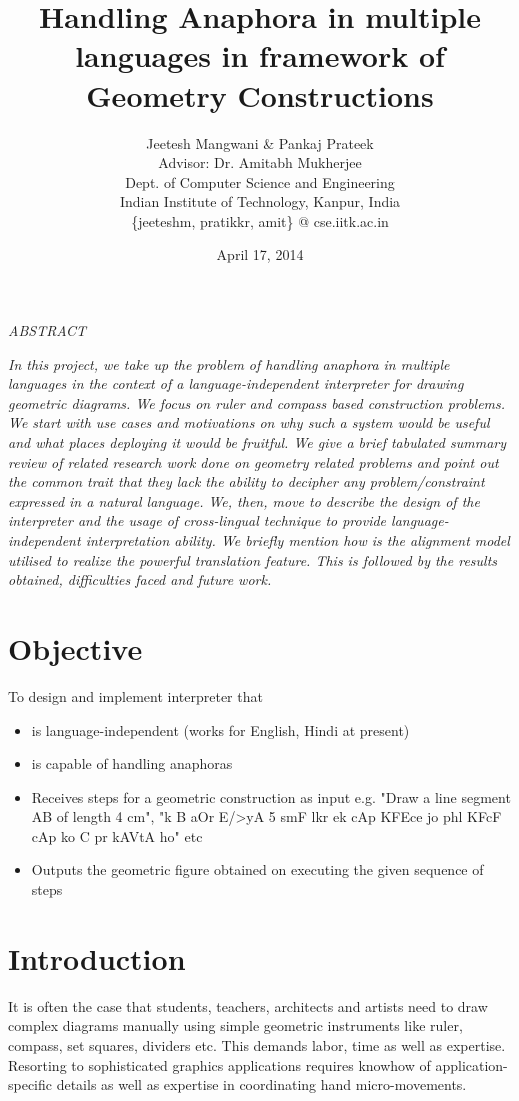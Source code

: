 \def\DevnagVersion{2.15}\documentclass[12pt]{article}
\title{Handling Anaphora in multiple languages in framework of Geometry Constructions}
\author{Jeetesh Mangwani \& Pankaj Prateek\\
	Advisor: Dr. Amitabh Mukherjee\\
        Dept. of Computer Science and Engineering\\
	Indian Institute of Technology, Kanpur, India\\
	\{jeeteshm, pratikkr, amit\} @ cse.iitk.ac.in}
\date{April 17, 2014}
\begin{document}
\maketitle
\begin{center}{\b \em ABSTRACT}\end{center}
{\em In this project, we take up the problem of handling anaphora in multiple languages in the context of a language-independent interpreter for drawing geometric diagrams. We focus on ruler and compass based construction problems. We start with use cases and motivations on why such a system would be useful and what places deploying it would be fruitful. We give a brief tabulated summary review of related research work done on geometry related problems and point out the common trait that they lack the ability to decipher any problem/constraint expressed in a natural language. We, then, move to describe the design of the interpreter and the usage of cross-lingual technique to provide language-independent interpretation ability. We briefly mention how is the alignment model utilised to realize the powerful translation feature. This is followed by the results obtained, difficulties faced and future work.}

\section{Objective}
To design and implement interpreter that
\begin{itemize}
	\item is language-independent (works for English, Hindi at present)
  \item is capable of handling anaphoras
	\item Receives steps for a geometric construction as input e.g. "Draw a line segment AB of length 4 cm", "{\dn k\?{\qva}} B {\dn aOr E/>yA} 5 {\dn s\?mF l\?kr ek cAp KF{\qva}Ece jo phl\? KF{\qva}cF cAp ko} C {\dn pr kAVtA ho}" etc
	\item Outputs the geometric figure obtained on executing the given sequence of steps 
\end{itemize}

\section{Introduction}
It is often the case that students, teachers, architects and artists need to draw complex diagrams manually using simple geometric instruments like ruler, compass, set squares, dividers etc. This demands labor, time as well as expertise. Resorting to sophisticated graphics applications requires knowhow of application-specific details as well as expertise in coordinating hand micro-movements.\\
\end{document}
